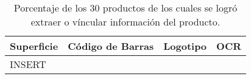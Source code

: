\begin{table}
\caption{Porcentaje de los 30 productos de los cuales se logró extraer o víncular información del producto.}
\label{table:porcentajeDeImagenesProcesadas}
    \begin{tabular}{ | m{2.5cm} | m{2.5cm} | m{2.5cm} | m{2.5cm} |}
    \hline 
    \textbf{Superficie}   & \textbf{Código de Barras} & \textbf{Logotipo} & \textbf{OCR} \\ \hline
{INSERT}
    \end{tabular}
\end{table}

